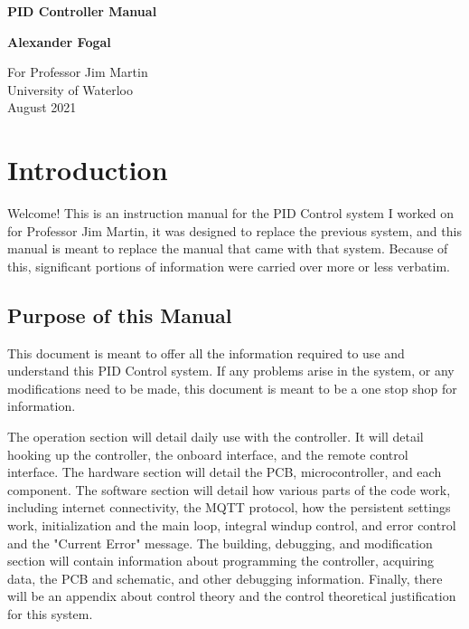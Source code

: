 \documentclass[11pt, letterpaper]{article}
\begin{document}
\begin{titlepage}
    \begin{center}
        \vspace*{1cm}

        \Huge
        \textbf{PID Controller Manual}

        \vspace{0.5cm}
        \LARGE

        \vspace{1.5cm}

        \textbf{Alexander Fogal}

        \vspace{7.8cm}

        \Large
        For Professor Jim Martin\\
        University of Waterloo\\
        August 2021

    \end{center}
\end{titlepage}

\tableofcontents

\newpage

\section{Introduction}
Welcome! This is an instruction manual for the PID Control system I worked on for Professor Jim Martin, it was designed to replace the previous system, and this manual is meant to replace the manual that came with that system. Because of this, significant portions of information were carried over more or less verbatim.

\subsection{Purpose of this Manual}
This document is meant to offer all the information required to use and understand this PID Control system. If any problems arise in the system, or any modifications need to be made, this document is meant to be a one stop shop for information.

The operation section will detail daily use with the controller. It will detail hooking up the controller, the onboard interface, and the remote control interface. The hardware section will detail the PCB, microcontroller, and each component. The software section will detail how various parts of the code work, including internet connectivity, the MQTT protocol, how the persistent settings work, initialization and the main loop, integral windup control, and error control and the "Current Error" message. The building, debugging, and modification section will contain information about programming the controller, acquiring data, the PCB and schematic, and other debugging information. Finally, there will be an appendix about control theory and the control theoretical justification for this system.
\end{document}
